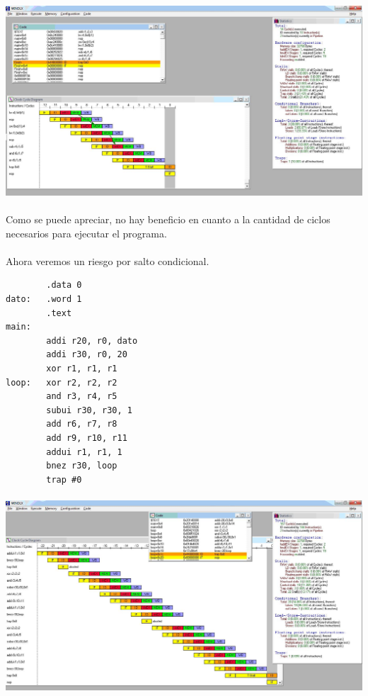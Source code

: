 \documentclass[a4paper,11pt]{article}
\begin{document}
\begin{enumerate}
\paragraph{}
\centering
\includegraphics[width=470pt]{punto5-2.JPG}

\paragraph{}
Como se puede apreciar, no hay beneficio en cuanto a la cantidad de ciclos necesarios para ejecutar el programa.

\paragraph{}
Ahora veremos un riesgo por salto condicional.

\begin{center}
\begin{verbatim}
		.data 0
dato: 	.word 1
		.text
main:
		addi r20, r0, dato
		addi r30, r0, 20
		xor r1, r1, r1
loop: 	xor r2, r2, r2
		and r3, r4, r5
		subui r30, r30, 1
		add r6, r7, r8
		add r9, r10, r11
		addui r1, r1, 1
		bnez r30, loop
		trap #0
\end{verbatim}
\end{center}

\paragraph{}
\centering
\includegraphics[width=470pt]{punto5-3.JPG}


\end{enumerate}
\end{document}
